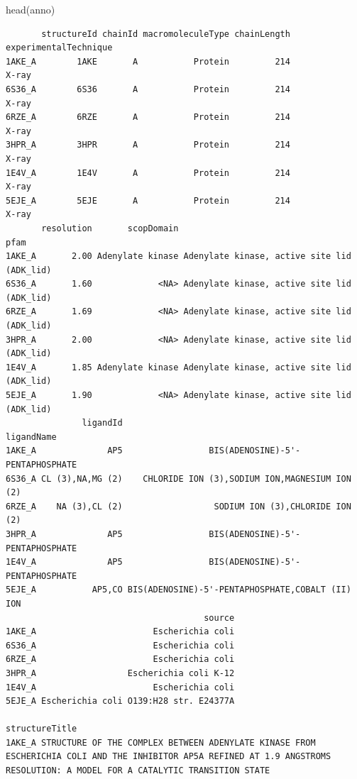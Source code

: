\documentclass[
  letterpaper,
  DIV=11,
  numbers=noendperiod]{scrartcl}
\newenvironment{Shaded}{\begin{snugshade}}{\end{snugshade}}
\newcommand{\FunctionTok}[1]{\textcolor[rgb]{0.28,0.35,0.67}{#1}}
\newcommand{\NormalTok}[1]{\textcolor[rgb]{0.00,0.23,0.31}{#1}}
\begin{document}
\begin{Shaded}
\begin{Highlighting}[]
\FunctionTok{head}\NormalTok{(anno)}
\end{Highlighting}
\end{Shaded}

\begin{verbatim}
       structureId chainId macromoleculeType chainLength experimentalTechnique
1AKE_A        1AKE       A           Protein         214                 X-ray
6S36_A        6S36       A           Protein         214                 X-ray
6RZE_A        6RZE       A           Protein         214                 X-ray
3HPR_A        3HPR       A           Protein         214                 X-ray
1E4V_A        1E4V       A           Protein         214                 X-ray
5EJE_A        5EJE       A           Protein         214                 X-ray
       resolution       scopDomain                                        pfam
1AKE_A       2.00 Adenylate kinase Adenylate kinase, active site lid (ADK_lid)
6S36_A       1.60             <NA> Adenylate kinase, active site lid (ADK_lid)
6RZE_A       1.69             <NA> Adenylate kinase, active site lid (ADK_lid)
3HPR_A       2.00             <NA> Adenylate kinase, active site lid (ADK_lid)
1E4V_A       1.85 Adenylate kinase Adenylate kinase, active site lid (ADK_lid)
5EJE_A       1.90             <NA> Adenylate kinase, active site lid (ADK_lid)
               ligandId                                       ligandName
1AKE_A              AP5                 BIS(ADENOSINE)-5'-PENTAPHOSPHATE
6S36_A CL (3),NA,MG (2)    CHLORIDE ION (3),SODIUM ION,MAGNESIUM ION (2)
6RZE_A    NA (3),CL (2)                  SODIUM ION (3),CHLORIDE ION (2)
3HPR_A              AP5                 BIS(ADENOSINE)-5'-PENTAPHOSPHATE
1E4V_A              AP5                 BIS(ADENOSINE)-5'-PENTAPHOSPHATE
5EJE_A           AP5,CO BIS(ADENOSINE)-5'-PENTAPHOSPHATE,COBALT (II) ION
                                       source
1AKE_A                       Escherichia coli
6S36_A                       Escherichia coli
6RZE_A                       Escherichia coli
3HPR_A                  Escherichia coli K-12
1E4V_A                       Escherichia coli
5EJE_A Escherichia coli O139:H28 str. E24377A
                                                                                                                                                                     structureTitle
1AKE_A STRUCTURE OF THE COMPLEX BETWEEN ADENYLATE KINASE FROM ESCHERICHIA COLI AND THE INHIBITOR AP5A REFINED AT 1.9 ANGSTROMS RESOLUTION: A MODEL FOR A CATALYTIC TRANSITION STATE

\end{verbatim}
\end{document}
